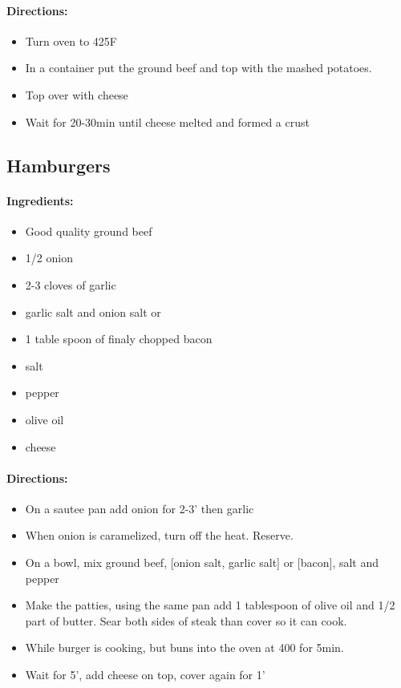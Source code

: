 \documentclass{article}
\begin{document}
\paragraph{Directions:}
\begin{itemize}
    \item Turn oven to 425F
    \item In a container put the ground beef and top with the mashed potatoes.
    \item Top over with cheese
    \item Wait for 20-30min until cheese melted and formed a crust
\end{itemize}

\subsection{Hamburgers}

\paragraph{Ingredients:}
\begin{itemize}
    \item Good quality ground beef
    \item 1/2 onion
    \item 2-3 cloves of garlic
    \item garlic salt and onion salt or
    \item 1 table spoon of finaly chopped bacon
    \item salt
    \item pepper
    \item olive oil
    \item cheese
\end{itemize}

\paragraph{Directions:}
\begin{itemize}
    \item On a sautee pan add onion for 2-3' then garlic
    \item When onion is caramelized, turn off the heat. Reserve.
    \item On a bowl, mix ground beef, [onion salt, garlic salt] or [bacon], salt and pepper
    \item Make the patties, using the same pan add 1 tablespoon of olive oil and 1/2 part of butter. Sear both sides of steak than cover so it can cook.
    \item While burger is cooking, but buns into the oven at 400 for 5min.
    \item Wait for 5', add cheese on top, cover again for 1'
\end{itemize}
\end{document}
